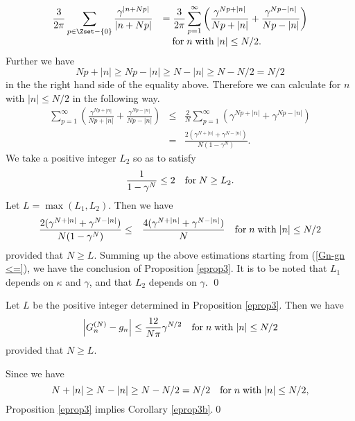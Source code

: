 \begin{pf}
\begin{eqnarray*}
\begin{array}{ll}
\displaystyle \frac{3}{2\pi}\sum _{p \in \Zset-\{0\}} \frac{\gamma^{|n+Np|}}{|n+Np|} 
&= \displaystyle  \frac{3}{2\pi}\sum^{\infty}_{p=1}\left(\frac{\gamma^{Np+|n|}}{Np+|n|}+\frac{\gamma^{Np-|n|}}{Np-|n|}\right) \\
 &\quad {\rm for}\;n\;{\rm with}\;|n| \le N/2.
\end{array}
\end{eqnarray*}
Further we have
\begin{displaymath}
Np+|n| \ge Np-|n| \ge N - |n| \ge N - N/2 = N/2
\end{displaymath}
in the the right hand side of the equality above.
Therefore we can calculate for $n$ with $|n|\le  N/2$ in the following way.
\begin{eqnarray*}
\sum^{\infty}_{p=1}\left(\frac{\gamma^{Np+|n|}}{Np+|n|}+\frac{\gamma^{Np-|n|}}{Np-|n|}\right) &\le& \frac{2}{N}\sum^{\infty}_{p=1}\left(\gamma^{Np+|n|}+\gamma^{Np-|n|}\right) \\
&=& \frac{2(\gamma^{N+|n|}+\gamma^{N-|n|})}{N(1-\gamma^{N})}.
\end{eqnarray*}
We take a positive integer $L_2$ so as to satisfy
\begin{displaymath}
\frac{1}{1-\gamma^N} \le 2 \quad {\rm for}\;N \ge L_2.
\end{displaymath}
Let $L=\max(L_1,L_2)$. Then we have
\begin{eqnarray*}
\frac{2(\gamma^{N+|n|}+\gamma^{N-|n|})}{N(1-\gamma^{N})} &\le& \frac{4(\gamma^{N+|n|}+\gamma^{N-|n|})}{N} 
\quad {\rm for}\;n\;{\rm with}\;|n| \le N/2
\end{eqnarray*}
provided that $N \ge L$. Summing up the above estimations starting from (\ref{Gn-gn <=}), we have the conclusion of Proposition \ref{eprop3}. It is to be noted that $L_1$ depends on $\kappa$ and $\gamma$, and that $L_2$ depends on $\gamma$.
\qed
\end{pf}

\begin{cor}
\label{eprop3b}
Let $L$ be the positive integer determined in Proposition \ref{eprop3}. Then we have
\begin{eqnarray*}
\left|G^{(N)}_n-g_n\right| \le \displaystyle \frac{12}{N \pi}\gamma^{N/2}
\quad {\rm for}\;n\;{\rm with}\; |n| \le N/2
\end{eqnarray*}
provided that $N \ge L$. 
\end{cor}
\begin{pf}
Since we have 
\begin{displaymath}
N+|n| \ge N-|n| \ge N-N/2=N/2 \quad {\rm for}\;n\;{\rm with}\;|n| \le N/2,
\end{displaymath}
Proposition \ref{eprop3} implies Corollary \ref{eprop3b}.\qed
\end{pf}


